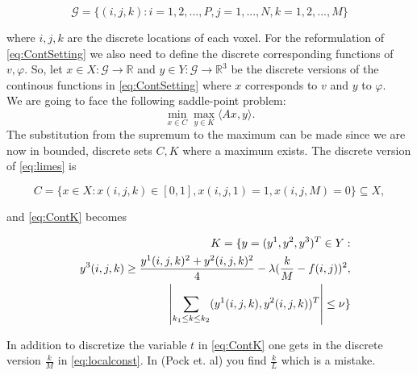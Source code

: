             \begin{equation}
                \mathcal{G} = \bigg\{ (i , j , k ): i = 1, 2, ..., P, j = 1, ..., N, k = 1, 2, ..., M \bigg\}
            \end{equation}

        where $i, j, k$ are the discrete locations of each voxel.
        For the reformulation of \ref{eq:ContSetting} we also need to define the discrete corresponding functions of $v, \varphi$. So, let $x \in X: \mathcal{G} \longrightarrow \mathbb{R}$ and $y \in Y: \mathcal{G} \longrightarrow \mathbb{R}^{3}$ be the discrete versions of the continous functions in \ref{eq:ContSetting} where $x$ corresponds to $v$ and $y$ to $\varphi$. \\
        We are going to face the following saddle-point problem:
            \begin{equation}
                \min_{x \in C} \max_{y \in K} \langle Ax, y \rangle. \label{eq:minmax}
            \end{equation}
        The substitution from the supremum to the maximum can be made since we are now in bounded, discrete sets $C, K$ where a maximum exists. The discrete version of \ref{eq:limes} is

            \begin{equation}
                C = \{ x \in X: x(i,j,k) \in [0,1], x(i, j, 1) = 1, x(i, j, M) = 0 \} \subseteq X,
            \end{equation}

        and \ref{eq:ContK} becomes

            \begin{eqnarray}
                &&K = \{ y = (y^{1}, y^{2}, y^{3})^{T} \in Y: \notag \\
                &&y^{3}(i,j,k) \ge \frac{y^{1}(i,j,k)^{2} + y^{2}(i,j,k)^{2}}{4} - \lambda(\frac{k}{M} - f(i,j))^{2}, \label{eq:localconst} \\
                &&\left| \sum_{k_{1} \le k \le k_{2}} (y^{1}(i,j,k), y^{2}(i,j,k))^{T} \right| \le \nu \} \label{eq:nonlocalconst}
            \end{eqnarray}

            \begin{remark}
                In addition to discretize the variable $t$ in \ref{eq:ContK} one gets in the discrete version $\frac{k}{M}$ in \ref{eq:localconst}. In (Pock et. al) you find $\frac{k}{L}$ which is a mistake.
            \end{remark}

